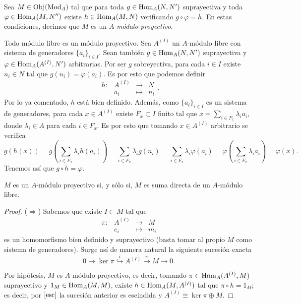\documentclass[../main.tex]{subfiles}
\begin{document}
\begin{definition}
	Sea $M\in\operatorname{Obj}(\operatorname{Mod}_A)$ tal que para toda $g\in\operatorname{Hom}_A(N,N')$ suprayectiva y toda $\varphi\in\operatorname{Hom}_A(M,N'')$ existe $h\in\operatorname{Hom}_A(M,N)$ verificando $g\circ\varphi=h$. En estas condiciones, decimos que $M$ es un \textit{$A$-módulo proyectivo}.
\end{definition}
\begin{remark}
	Todo módulo libre es un módulo proyectivo. Sea $A^{(I)}$ un $A$-módulo libre con sistema de generadores $\{a_i\}_{i\in I}$. Sean también $g\in\operatorname{Hom}_A(N,N')$ suprayectiva y $\varphi\in\operatorname{Hom}_A(A^{(I)},N')$ arbitrarias. Por ser $g$ sobreyectiva, para cada $i\in I$ existe $n_i\in N$ tal que $g(n_i)=\varphi(a_i)$. Es por esto que podemos definir
	$$
	\begin{array}{rrcl}
	h:&A^{(I)}&\longrightarrow&N\\
	&a_i&\longmapsto&n_i
	\end{array}.$$
	Por lo ya comentado, $h$ está bien definido. Además, como $\{a_i\}_{i\in I}$ es un sistema de generadores, para cada $x\in A^{(I)}$ existe $F_x\subset I$ finito tal que $x=\sum_{i\in F_x}\lambda_i a_i$, donde $\lambda_i\in A$ para cada $i\in F_x$.
	Es por esto que tomando $x\in A^{(I)}$ arbitrario se verifica
	$$g(h(x))=g\left(\sum_{i\in F_x}\lambda_i h(a_i)\right)=\sum_{i\in F_x}\lambda_i g(n_i)=\sum_{i\in F_x}\lambda_i \varphi(a_i)=\varphi\left(\sum_{i\in F_x}\lambda_i a_i\right)=\varphi(x).$$
	Tenemos así que $g\circ h=\varphi$.
\end{remark}

\begin{proposition}
	$M$ es un $A$-módulo proyectivo si, y sólo si, $M$ es suma directa de un $A$-módulo libre.
\end{proposition}
\begin{proof}
	($\Rightarrow$) Sabemos que existe $I\subset M$ tal que
	$$\begin{array}{rrcl}
	\pi:&A^{(I)}&\longrightarrow&M  \\
	&e_i&\longmapsto&m_i
	\end{array}$$
	es un homomorfismo bien definido y suprayectivo (basta tomar al propio $M$ como sistema de generadores). Surge así de manera natural la siguiente sucesión exacta
	$$0\rightarrow\ker{\pi}\overset{i}{\hookrightarrow}A^{(I)}\overset{\pi}{\rightarrow}M\rightarrow0.$$
	
	Por hipótesis, $M$ es $A$-módulo proyectivo, es decir, tomando $\pi\in\operatorname{Hom}_A(A^{(I)},M)$ suprayectivo y $1_M\in\operatorname{Hom}_A(M,M)$, existe $h\in\operatorname{Hom}_A(M,A^{(I)})$ tal que $\pi\circ h=1_M$; es decir, por $\ref{esc}$ la sucesión anterior es escindida y $A^{(I)}\cong \ker\pi\oplus M$.
\end{proof}
\end{document}
